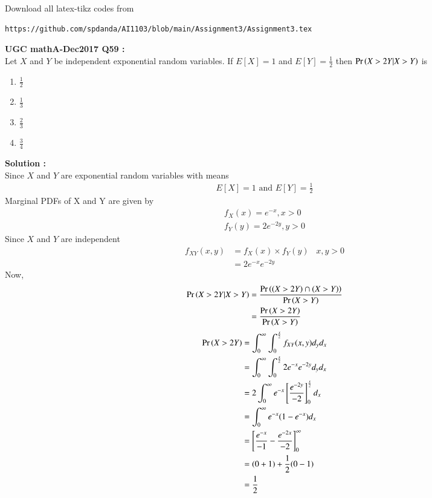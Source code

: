 \documentclass[journal,12pt,twocolumn]{IEEEtran}
\begin{document}
\maketitle
\newpage
\bigskip
\renewcommand{\thefigure}{\theenumi}
\renewcommand{\thetable}{\theenumi}
Download all latex-tikz codes from 
%
\begin{lstlisting}
https://github.com/spdanda/AI1103/blob/main/Assignment3/Assignment3.tex
\end{lstlisting}
\large\textbf{UGC mathA-Dec2017 Q59 :}\\
Let $X$ and $Y$ be independent exponential random variables. If $E[X]=1$ and $E[Y]=\frac{1}{2}$ then $\Pr\left(X>2Y|X>Y\right)$ is
\begin{multicols}{2}
    \begin{enumerate}[label=\arabic*.]
        \item \Large$\frac{1}{2}$ \\
        \item $\frac{1}{3}$
        \item $\frac{2}{3}$ \\
        \item $\frac{3}{4}$
    \end{enumerate}
\end{multicols}
\textbf{Solution :}\\
Since $X$ and $Y$ are exponential random variables with means
\begin{align}
    E[X] = 1 \text{ and }
    E[Y] = \frac{1}{2}
\end{align}
Marginal PDFs of X and Y are given by
\begin{align}
    f_X(x)= e^{-x} , x>0 \\
    f_Y(y) = 2e^{-2y} , y>0
\end{align}
Since $X$ and $Y$ are independent
\begin{align}
    f_{XY}(x,y) &= f_X(x)\times f_Y(y) \;\;\;x,y >0 \\
                &= 2e^{-x}e^{-2y}
\end{align}
Now,
\begin{align}
    \Pr\left(X>2Y|X>Y\right) &= \dfrac{\Pr\left((X>2Y) \cap (X>Y)\right) }{\Pr\left(X>Y\right)}\\
                  &= \dfrac{\Pr\left(X>2Y\right)}{\Pr\left(X>Y\right)} \label{simul1}
\end{align}
\begin{align}
    \Pr\left(X>2Y\right) &= \int_{0}^{\infty}\int_{0}^{\frac{x}{2}} f_{XY}(x,y) d_yd_x \\
              &= \int_{0}^{\infty}\int_{0}^{\frac{x}{2}} 2e^{-x}e^{-2y}d_yd_x \\
              &= 2\int_{0}^{\infty} e^{-x} \left[\frac{e^{-2y}}{-2}\right]_0^{\frac{x}{2}}d_x\\
              &= \int_{0}^{\infty} e^{-x}(1-e^{-x})d_x\\
              &= \left[\frac{e^{-x}}{-1} - \frac{e^{-2x}}{-2}\right]_0^\infty\\
              &= (0+1) + \frac{1}{2}(0-1)\\
              &= \frac{1}{2} \label{simul2}
\end{align}
\end{document}

